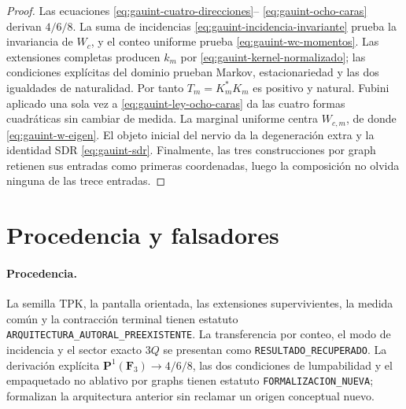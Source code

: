 \begin{proof}
Las ecuaciones \eqref{eq:gauint-cuatro-direcciones}--
\eqref{eq:gauint-ocho-caras} derivan \(4/6/8\). La suma de incidencias
\eqref{eq:gauint-incidencia-invariante} prueba la invariancia de \(W_c\), y
el conteo uniforme prueba \eqref{eq:gauint-wc-momentos}. Las extensiones
completas producen \(k_m\) por \eqref{eq:gauint-kernel-normalizado}; las
condiciones explícitas del dominio prueban Markov, estacionariedad y las dos
igualdades de naturalidad. Por tanto \(T_m=K_m^*K_m\) es positivo y natural.
Fubini aplicado una sola vez a \eqref{eq:gauint-ley-ocho-caras} da las cuatro
formas cuadráticas sin cambiar de medida. La marginal uniforme centra
\(W_{c,m}\), de donde \eqref{eq:gauint-w-eigen}. El objeto inicial del nervio
da la degeneración extra y la identidad SDR \eqref{eq:gauint-sdr}. Finalmente,
las tres construcciones por graph retienen sus entradas como primeras
coordenadas, luego la composición no olvida ninguna de las trece entradas.
\end{proof}

\section{Procedencia y falsadores}

\paragraph{Procedencia.}
La semilla TPK, la pantalla orientada, las extensiones supervivientes, la
medida común y la contracción terminal tienen estatuto
\texttt{ARQUITECTURA\_AUTORAL\_PREEXISTENTE}. La transferencia por conteo,
el modo de incidencia y el sector exacto \(3Q\) se presentan como
\texttt{RESULTADO\_RECUPERADO}. La derivación explícita
\(\mathbf P^1(\mathbf F_3)\to4/6/8\), las dos condiciones de lumpabilidad y
el empaquetado no ablativo por graphs tienen estatuto
\texttt{FORMALIZACION\_NUEVA}; formalizan la arquitectura anterior sin
reclamar un origen conceptual nuevo.

